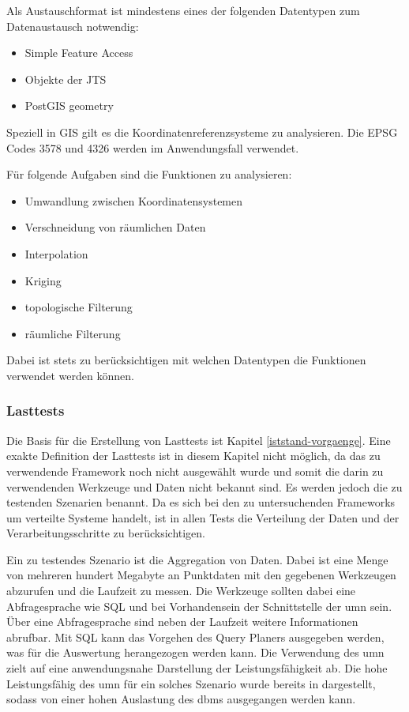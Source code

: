 Als Austauschformat ist mindestens eines der folgenden Datentypen zum Datenaustausch notwendig:
\begin{itemize}
\item Simple Feature Access
\item Objekte der JTS
\item PostGIS geometry
\end{itemize}

Speziell in GIS gilt es die Koordinatenreferenzsysteme zu analysieren.
Die EPSG Codes 3578 und 4326 werden im Anwendungsfall verwendet.

Für folgende Aufgaben sind die Funktionen zu analysieren:
\begin{itemize}
\setlength{\itemsep}{-8pt}
\item Umwandlung zwischen Koordinatensystemen
\item Verschneidung von räumlichen Daten
\item Interpolation
\item Kriging
\item topologische Filterung
\item räumliche Filterung
\end{itemize}
Dabei ist stets zu berücksichtigen mit welchen Datentypen die Funktionen verwendet werden können.

\subsubsection{Lasttests}
Die Basis für die Erstellung von Lasttests ist Kapitel \ref{iststand-vorgaenge}.
Eine exakte Definition der Lasttests ist in diesem Kapitel nicht möglich, da das zu verwendende Framework noch nicht ausgewählt wurde und somit die darin zu verwendenden Werkzeuge und Daten nicht bekannt sind.
Es werden jedoch die zu testenden Szenarien benannt.
Da es sich bei den zu untersuchenden Frameworks um verteilte Systeme handelt, ist in allen Tests die Verteilung der Daten und der Verarbeitungsschritte zu berücksichtigen.

Ein zu testendes Szenario ist die Aggregation von Daten.
Dabei ist eine Menge von mehreren hundert Megabyte an Punktdaten mit den gegebenen Werkzeugen abzurufen und die Laufzeit zu messen.
Die Werkzeuge sollten dabei eine Abfragesprache wie SQL und bei Vorhandensein der Schnittstelle der \Gls{umn} sein.
Über eine Abfragesprache sind neben der Laufzeit weitere Informationen abrufbar.
Mit SQL kann das Vorgehen des Query Planers ausgegeben werden, was für die Auswertung herangezogen werden kann.
Die Verwendung des \Gls{umn} zielt auf eine anwendungsnahe Darstellung der Leistungsfähigkeit ab.
Die hohe Leistungsfähig des \Gls{umn} für ein solches Szenario wurde bereits in \cite{ba:kurt} dargestellt, sodass von einer hohen Auslastung des \Gls{dbms} ausgegangen werden kann.

